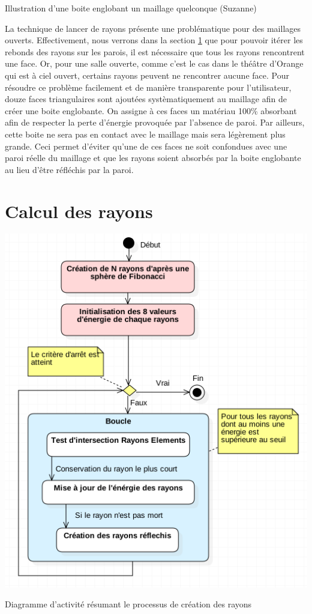 \begin{figureth}
\begin{subfigureth}{0.35\textwidth}
		\label{boiteenglobante2}
	\end{subfigureth}
	\caption{Illustration d'une boite englobant un maillage quelconque (Suzanne)}
\end{figureth}

La technique de lancer de rayons présente une problématique pour des maillages ouverts. Effectivement, nous verrons dans la section \ref{sect_rayon} que pour pouvoir itérer les rebonds des rayons sur les parois, il est nécessaire que tous les rayons rencontrent une face. Or, pour une salle ouverte, comme c'est le cas dans le théâtre d'Orange qui est à ciel ouvert, certains rayons peuvent ne rencontrer aucune face. Pour résoudre ce problème facilement et de manière transparente pour l'utilisateur, douze faces triangulaires sont ajoutées systèmatiquement au maillage afin de créer une boite englobante. On assigne à ces faces un matériau 100\% absorbant afin de respecter la perte d'énergie provoquée par l'absence de paroi. Par ailleurs, cette boite ne sera pas en contact avec le maillage mais sera légèrement plus grande. Ceci permet d'éviter qu'une de ces faces ne soit confondues avec une paroi réelle du maillage et que les rayons soient absorbés par la boite englobante au lieu d'être réfléchis par la paroi.




\section{Calcul des rayons} \label{sect_rayon}

\begin{figureth}
	\includegraphics[width=0.7\linewidth]{images/DiagRay}
	\caption{Diagramme d'activité résumant le processus de création des rayons}
	\label{DiagRay}
\end{figureth}

